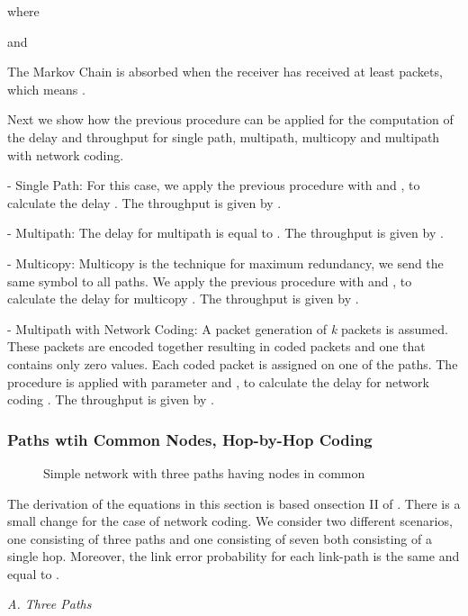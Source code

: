 \documentclass[journal, onecolumn, 12pt]{IEEEtran}
\begin{document}
where



and


The Markov Chain is absorbed when the receiver has received at least  packets, which means .

Next we show how the previous procedure can be applied for the computation of the delay and throughput for single path, multipath, multicopy and multipath with network coding.

- Single Path: For this case, we apply the previous procedure with  and , to calculate the delay .
The throughput is given by .

- Multipath: The delay for multipath is equal to .
The throughput is given by .

- Multicopy: Multicopy is the technique for maximum redundancy, we send the same symbol to all paths.
We apply the previous procedure with  and , to calculate the delay for multicopy .
The throughput is given by .

- Multipath with Network Coding:
A packet generation of \textit{k} packets is assumed.
These packets are encoded together resulting in  coded packets and one that contains only zero values.
Each coded packet is assigned on one of the  paths.
The procedure is applied with parameter  and , to calculate the delay for network coding .
The throughput is given by .

\subsubsection{Paths wtih Common Nodes, Hop-by-Hop Coding}
\label{sec:analysis_hopbyhop}

\begin{figure}[ht]
\centering
{}
\label{fig:network}
\caption{Simple network with three paths having nodes in common}
\end{figure}

The derivation of the equations in this section is based onsection II of \cite{b:pathdivgain1}.
There is a small change for the case of network coding.
We consider two different scenarios, one consisting of three paths and one consisting of seven both consisting of a single hop.
Moreover, the link error probability for each link-path is the same and equal to .

\textit{A. Three Paths}
\end{document}
